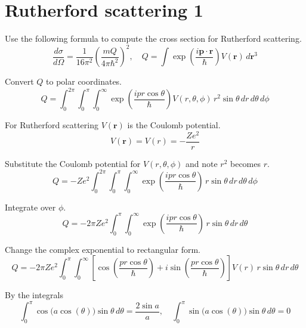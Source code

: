 


\section*{Rutherford scattering 1}

Use the following formula to compute the cross section for Rutherford scattering.
\begin{equation*}
\frac{d\sigma}{d\Omega}=\frac{1}{16\pi^2}\left(\frac{mQ}{4\pi\hbar^2}\right)^2,\quad
Q=\int\exp\left(\frac{i\mathbf p\cdot\mathbf r}{\hbar}\right)V(\mathbf r)\,d\mathbf r^3
\end{equation*}

Convert $Q$ to polar coordinates.
\begin{equation*}
Q=\int_0^{2\pi}
\int_0^\pi
\int_0^\infty
\exp\left(\frac{ipr\cos\theta}{\hbar}\right)V(r,\theta,\phi)
\,r^2\sin\theta\,dr\,d\theta\,d\phi
\end{equation*}

For Rutherford scattering $V(\mathbf r)$ is the Coulomb potential.
\begin{equation*}
V(\mathbf r)=V(r)=-\frac{Ze^2}{r}
\end{equation*}

Substitute the Coulomb potential for $V(r,\theta,\phi)$ and note $r^2$ becomes $r$.
\begin{equation*}
Q=-Ze^2
\int_0^{2\pi}
\int_0^\pi
\int_0^\infty
\exp\left(\frac{ipr\cos\theta}{\hbar}\right)
\,r\sin\theta\,dr\,d\theta\,d\phi
\end{equation*}

Integrate over $\phi$.
\begin{equation*}
Q=-2\pi Ze^2
\int_0^\pi
\int_0^\infty
\exp\left(\frac{ipr\cos\theta}{\hbar}\right)
\,r\sin\theta\,dr\,d\theta
\end{equation*}

Change the complex exponential to rectangular form.
\begin{equation*}
Q=-2\pi Ze^2
\int_0^\pi
\int_0^\infty
\left[
\cos\left(\frac{pr\cos\theta}{\hbar}\right)
+i\sin\left(\frac{pr\cos\theta}{\hbar}\right)
\right]
V(r)\,r\sin\theta\,dr\,d\theta
\end{equation*}

By the integrals
\begin{equation*}
\int_0^\pi\cos\bigl(a\cos(\theta)\bigr)\sin\theta\,d\theta=\frac{2\sin a}{a},\quad
\int_0^\pi\sin\bigl(a\cos(\theta)\bigr)\sin\theta\,d\theta=0
\end{equation*}


